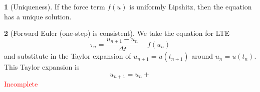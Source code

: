 \documentclass[12pt]{article}
\theoremstyle{definition}
\newtheorem{theorem}{\color{ForestGreen}{\textbf{Theorem}}}
\begin{document}
\begin{theorem}[Uniqueness]
If the force term $f(u)$ is uniformly Lipshitz, then the equation has a unique solution.
\end{theorem}

\begin{theorem}[Forward Euler (one-step) is consistent]
We take the equation for LTE
\begin{equation}
\tau_n = \frac{u_{n+1} - u_n}{\Delta t} - f(u_n)
\end{equation}
and substitute in the Taylor expansion of $u_{n+1} = u(t_{n+1})$ around $u_n = u(t_n)$. This Taylor expansion is
\begin{equation}
u_{n+1} = u_n +
\end{equation}
\textcolor{red}{Incomplete}
\end{theorem}
\end{document}

